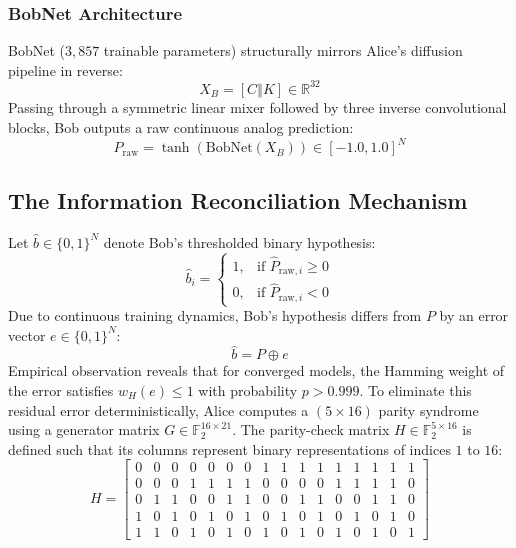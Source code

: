 \documentclass[journal,10pt,twocolumn]{IEEEtran}
\begin{document}
\subsubsection{BobNet Architecture}
BobNet ($3,857$ trainable parameters) structurally mirrors Alice's diffusion pipeline in reverse:
\begin{equation}
    X_B = [C \mathbin{\Vert} K] \in \mathbb{R}^{32}
\end{equation}
Passing through a symmetric linear mixer followed by three inverse convolutional blocks, Bob outputs a raw continuous analog prediction:
\begin{equation}
    \hat{P}_{\text{raw}} = \tanh(\text{BobNet}(X_B)) \in [-1.0, 1.0]^N
\end{equation}

\subsection{The Information Reconciliation Mechanism}
Let $\hat{b} \in \{0, 1\}^N$ denote Bob's thresholded binary hypothesis:
\begin{equation}
    \hat{b}_i = \begin{cases} 1, & \text{if } \hat{P}_{\text{raw}, i} \ge 0 \\ 0, & \text{if } \hat{P}_{\text{raw}, i} < 0 \end{cases}
\end{equation}
Due to continuous training dynamics, Bob's hypothesis differs from $P$ by an error vector $e \in \{0, 1\}^N$:
\begin{equation}
    \hat{b} = P \oplus e
\end{equation}
Empirical observation reveals that for converged models, the Hamming weight of the error satisfies $w_H(e) \le 1$ with probability $p > 0.999$. To eliminate this residual error deterministically, Alice computes a $(5 \times 16)$ parity syndrome using a generator matrix $G \in \mathbb{F}_2^{16 \times 21}$. The parity-check matrix $H \in \mathbb{F}_2^{5 \times 16}$ is defined such that its columns represent binary representations of indices $1$ to $16$:
\begin{equation}
    H = \begin{bmatrix}
    0 & 0 & 0 & 0 & 0 & 0 & 0 & 1 & 1 & 1 & 1 & 1 & 1 & 1 & 1 & 1 \\
    0 & 0 & 0 & 1 & 1 & 1 & 1 & 0 & 0 & 0 & 0 & 1 & 1 & 1 & 1 & 0 \\
    0 & 1 & 1 & 0 & 0 & 1 & 1 & 0 & 0 & 1 & 1 & 0 & 0 & 1 & 1 & 0 \\
    1 & 0 & 1 & 0 & 1 & 0 & 1 & 0 & 1 & 0 & 1 & 0 & 1 & 0 & 1 & 0 \\
    1 & 1 & 0 & 1 & 0 & 1 & 0 & 1 & 0 & 1 & 0 & 1 & 0 & 1 & 0 & 1
    \end{bmatrix}
\end{equation}
\end{document}
